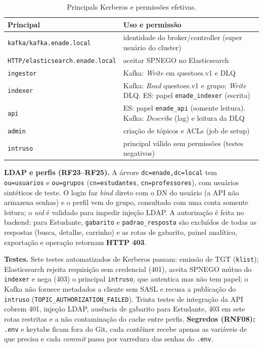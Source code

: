 \documentclass[12pt]{article}
\newcommand{\cod}[1]{\texttt{\small #1}}
\begin{document}
\begin{table}[ht]
\centering
\caption{Principals Kerberos e permissões efetivas.}\label{tab:principals}
\small
\begin{tabularx}{\textwidth}{lX}
\toprule
Principal & Uso e permissão \\
\midrule
\cod{kafka/kafka.enade.local} & identidade do broker/controller (super usuário do cluster) \\
\cod{HTTP/elasticsearch.enade.local} & aceitar SPNEGO no Elasticsearch \\
\cod{ingestor} & Kafka: \textit{Write} em questoes.v1 e DLQ \\
\cod{indexer} & Kafka: \textit{Read} questoes.v1 e grupo; \textit{Write} DLQ. ES: papel \cod{enade\_indexer} (escrita) \\
\cod{api} & ES: papel \cod{enade\_api} (somente leitura). Kafka: \textit{Describe} (lag) e leitura da DLQ \\
\cod{admin} & criação de tópicos e ACLs (job de setup) \\
\cod{intruso} & principal válido sem permissões (testes negativos) \\
\bottomrule
\end{tabularx}
\end{table}

\textbf{LDAP e perfis (RF23--RF25).} A árvore \cod{dc=enade,dc=local} tem \cod{ou=usuarios} e \cod{ou=grupos}
(\cod{cn=estudantes}, \cod{cn=professores}), com usuários sintéticos de teste. O login faz \textit{bind} direto
com o DN do usuário (a API não armazena senhas) e o perfil vem do grupo, consultado com uma conta somente
leitura; o \textit{uid} é validado para impedir injeção LDAP. A autorização é feita no backend: para Estudante,
\cod{gabarito} e \cod{padrao\_resposta} são excluídos de todas as respostas (busca, detalhe, carrinho) e as rotas
de gabarito, painel analítico, exportação e operação retornam \textbf{HTTP 403}.

\textbf{Testes.} Sete testes automatizados de Kerberos passam: emissão de TGT (\cod{klist}); Elasticsearch
rejeita requisição sem credencial (401), aceita SPNEGO mútuo do \cod{indexer} e nega (403) o principal
\cod{intruso}, que autentica mas não tem papel; o Kafka não fornece metadados a cliente sem SASL e recusa a
publicação do \cod{intruso} (\cod{TOPIC\_AUTHORIZATION\_FAILED}). Trinta testes de integração da API cobrem 401,
injeção LDAP, ausência de gabarito para Estudante, 403 em sete rotas restritas e a não contaminação do cache
entre perfis. \textbf{Segredos (RNF08):} \cod{.env} e keytabs ficam fora do Git, cada contêiner recebe apenas
as variáveis de que precisa e cada \textit{commit} passa por varredura das senhas do \cod{.env}.
\end{document}
